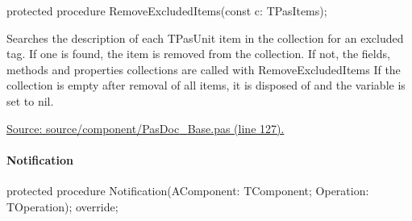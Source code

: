 \documentclass{report}
\newif\ifpdf
\begin{document}
\label{PasDoc_Base.TPasDoc-RemoveExcludedItems}
\begin{list}{}{
\setlength{\itemindent}{0cm}
\setlength{\listparindent}{0cm}
\setlength{\leftmargin}{\evensidemargin}
\addtolength{\leftmargin}{\tmplength}
\settowidth{\labelsep}{X}
\addtolength{\leftmargin}{\labelsep}
\setlength{\labelwidth}{\tmplength}
}
\item[\textbf{Declaration}\hfill]
\ifpdf
\begin{flushleft}
\fi
\begin{ttfamily}
protected procedure RemoveExcludedItems(const c: TPasItems);\end{ttfamily}

\ifpdf
\end{flushleft}
\fi

\par
\item[\textbf{Description}]
Searches the description of each TPasUnit item in the collection for an excluded tag. If one is found, the item is removed from the collection. If not, the fields, methods and properties collections are called with RemoveExcludedItems If the collection is empty after removal of all items, it is disposed of and the variable is set to nil.\par
\href{https://github.com/pasdoc/pasdoc/blob/master/source/component/PasDoc_Base.pas#L127}{Source: source/component/PasDoc{\_}Base.pas (line 127).}

\end{list}
\paragraph*{Notification}\hspace*{\fill}

\label{PasDoc_Base.TPasDoc-Notification}
\begin{list}{}{
\setlength{\itemindent}{0cm}
\setlength{\listparindent}{0cm}
\setlength{\leftmargin}{\evensidemargin}
\addtolength{\leftmargin}{\tmplength}
\settowidth{\labelsep}{X}
\addtolength{\leftmargin}{\labelsep}
\setlength{\labelwidth}{\tmplength}
}
\item[\textbf{Declaration}\hfill]
\ifpdf
\begin{flushleft}
\fi
\begin{ttfamily}
protected procedure Notification(AComponent: TComponent; Operation: TOperation); override;\end{ttfamily}

\ifpdf
\end{flushleft}
\fi

\end{list}
\end{document}
